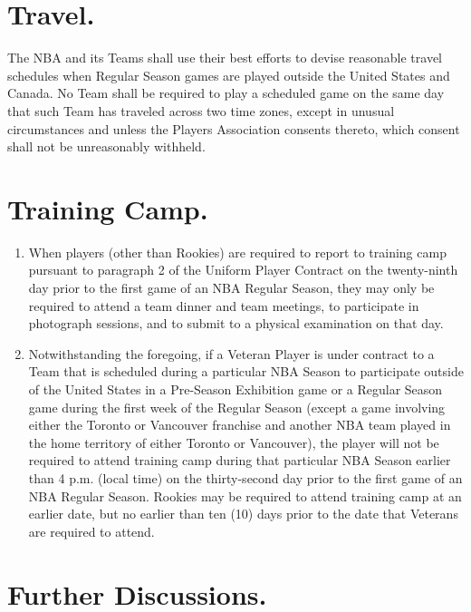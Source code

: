 \documentclass[
]{book}
\providecommand{\tightlist}{%
  \setlength{\itemsep}{0pt}\setlength{\parskip}{0pt}}
\begin{document}
\hypertarget{travel.}{%
\section{Travel.}\label{travel.}}

The NBA and its Teams shall use their best efforts to devise reasonable travel schedules when Regular Season games are played outside the United States and Canada. No Team shall be required to play a scheduled game on the same day that such Team has traveled across two time zones, except in unusual circumstances and unless the Players Association consents thereto, which consent shall not be unreasonably withheld.

\hypertarget{training-camp.}{%
\section{Training Camp.}\label{training-camp.}}

\begin{enumerate}
\def\labelenumi{(\alph{enumi})}
\tightlist
\item
  When players (other than Rookies) are required to report to training camp pursuant to paragraph 2 of the Uniform Player Contract on the twenty-ninth day prior to the first game of an NBA Regular Season, they may only be required to attend a team dinner and team meetings, to participate in photograph sessions, and to submit to a physical examination on that day.
\item
  Notwithstanding the foregoing, if a Veteran Player is under contract to a Team that is scheduled during a particular NBA Season to participate outside of the United States in a Pre-Season Exhibition game or a Regular Season game during the first week of the Regular Season (except a game involving either the Toronto or Vancouver franchise and another NBA team played in the home territory of either Toronto or Vancouver), the player will not be required to attend training camp during that particular NBA Season earlier than 4 p.m. (local time) on the thirty-second day prior to the first game of an NBA Regular Season. Rookies may be required to attend training camp at an earlier date, but no earlier than ten (10) days prior to the date that Veterans are required to attend.
\end{enumerate}

\hypertarget{further-discussions.}{%
\section{Further Discussions.}\label{further-discussions.}}
\end{document}
